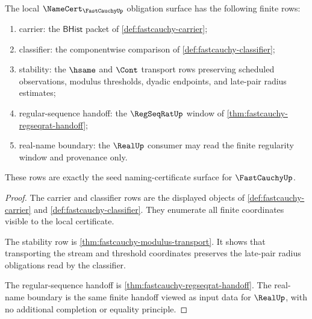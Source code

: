 \begin{theorem}
\label{thm:fastcauchy-namecert-obligation-surface}
The local $\NameCert_{\FastCauchyUp}$ obligation surface has the following finite rows:
\begin{enumerate}
\item carrier: the $\mathsf{BHist}$ packet of \autoref{def:fastcauchy-carrier};
\item classifier: the componentwise comparison of \autoref{def:fastcauchy-classifier};
\item stability: the $\hsame$ and $\Cont$ transport rows preserving scheduled observations, modulus thresholds, dyadic endpoints, and late-pair radius estimates;
\item regular-sequence handoff: the $\RegSeqRatUp$ window of \autoref{thm:fastcauchy-regseqrat-handoff};
\item real-name boundary: the $\RealUp$ consumer may read the finite regularity window and provenance only.
\end{enumerate}
These rows are exactly the seed naming-certificate surface for $\FastCauchyUp$.
\end{theorem}
\begin{proof}
The carrier and classifier rows are the displayed objects of \autoref{def:fastcauchy-carrier} and \autoref{def:fastcauchy-classifier}. They enumerate all finite coordinates visible to the local certificate.

The stability row is \autoref{thm:fastcauchy-modulus-transport}. It shows that transporting the stream and threshold coordinates preserves the late-pair radius obligations read by the classifier.

The regular-sequence handoff is \autoref{thm:fastcauchy-regseqrat-handoff}. The real-name boundary is the same finite handoff viewed as input data for $\RealUp$, with no additional completion or equality principle.
\end{proof}

